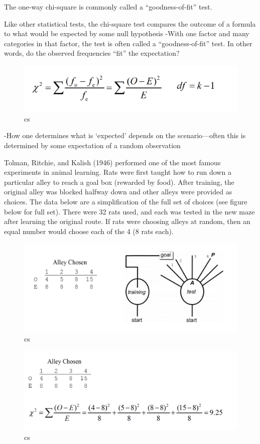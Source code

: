 \documentclass[]{book}
\theoremstyle{definition}
\theoremstyle{definition}
\theoremstyle{definition}
\theoremstyle{remark}
\begin{document}
The one-way chi-square is commonly called a ``goodness-of-fit'' test.

Like other statistical tests, the chi-square test compares the outcome
of a formula to what would be expected by some null hypothesis -With one
factor and many categories in that factor, the test is often called a
``goodness-of-fit'' test. In other words, do the observed frequencies
``fit'' the expectation?

\begin{figure}
\centering
\includegraphics{img/hickscs2.png}
\caption{cs}
\end{figure}

-How one determines what is `expected' depends on the scenario---often
this is determined by some expectation of a random observation

Tolman, Ritchie, and Kalish (1946) performed one of the most famous
experiments in animal learning. Rats were first taught how to run down a
particular alley to reach a goal box (rewarded by food). After training,
the original alley was blocked halfway down and other alleys were
provided as choices. The data below are a simplification of the full set
of choices (see figure below for full set). There were 32 rats used, and
each was tested in the new maze after learning the original route. If
rats were choosing alleys at random, then an equal number would choose
each of the 4 (8 rats each).

\begin{figure}
\centering
\includegraphics{img/hickscs3.png}
\caption{cs}
\end{figure}

\begin{figure}
\centering
\includegraphics{img/hickscs4.png}
\caption{cs}
\end{figure}
\end{document}
